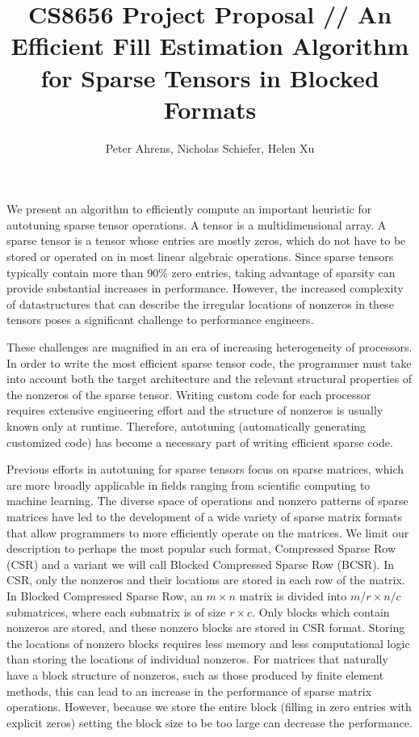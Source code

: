 \documentclass[12pt]{article}
\title{CS8656 Project Proposal // An Efficient Fill Estimation Algorithm for Sparse Tensors in Blocked Formats}
\author{Peter Ahrens, Nicholas Schiefer, Helen Xu}
\date{}
\begin{document}
  \maketitle

  We present an algorithm to efficiently compute an important heuristic for autotuning sparse tensor operations. A tensor is a multidimensional array. A sparse tensor is a tensor whose entries are mostly zeros, which do not have to be stored or operated on in most linear algebraic operations. Since sparse tensors typically contain more than 90\% zero entries, taking advantage of sparsity can provide substantial increases in performance. However, the increased complexity of datastructures that can describe the irregular locations of nonzeros in these tensors poses a significant challenge to performance engineers.

  These challenges are magnified in an era of increasing heterogeneity of processors. In order to write the most efficient sparse tensor code, the programmer must take into account both the target architecture and the relevant structural properties of the nonzeros of the sparse tensor. Writing custom code for each processor requires extensive engineering effort and the structure of nonzeros is usually known only at runtime. Therefore, autotuning (automatically generating customized code) has become a necessary part of writing efficient sparse code.

  Previous efforts in autotuning for sparse tensors focus on sparse matrices, which are more broadly applicable in fields ranging from scientific computing to machine learning. The diverse space of operations and nonzero patterns of sparse matrices have led to the development of a wide variety of sparse matrix formats that allow programmers to more efficiently operate on the matrices. We limit our description to perhaps the most popular such format, Compressed Sparse Row (CSR) and a variant we will call Blocked Compressed Sparse Row (BCSR). In CSR, only the nonzeros and their locations are stored in each row of the matrix. In Blocked Compressed Sparse Row, an $m \times n$ matrix is divided into $m/r \times n/c$ submatrices, where each submatrix is of size $r \times c$. Only blocks which contain nonzeros are stored, and these nonzero blocks are stored in CSR format. Storing the locations of nonzero blocks requires less memory and less computational logic than storing the locations of individual nonzeros. For matrices that naturally have a block structure of nonzeros, such as those produced by finite element methods, this can lead to an increase in the performance of sparse matrix operations. However, because we store the entire block (filling in zero entries with explicit zeros) setting the block size to be too large can decrease the performance.
\end{document}
